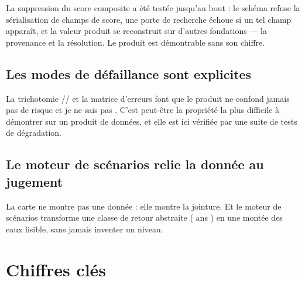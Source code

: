 La suppression du score composite a été testée jusqu'au bout : le schéma refuse
la sérialisation de champs de score, une porte de recherche échoue si un tel
champ apparaît, et la valeur produit se reconstruit sur d'autres fondations —
la provenance et la résolution. Le produit est démontrable sans son chiffre.

\subsection{Les modes de défaillance sont explicites}

La trichotomie // et la matrice d'erreurs
font que le produit ne confond jamais \og pas de risque \fg{} et \og je ne sais
pas \fg. C'est peut-être la propriété la plus difficile à démontrer sur un
produit de données, et elle est ici vérifiée par une suite de tests de
dégradation.

\subsection{Le moteur de scénarios relie la donnée au jugement}

La carte ne montre pas une donnée : elle montre la jointure. Et le moteur de
scénarios transforme une classe de retour abstraite ( ans \fg) en une
montée des eaux lisible, sans jamais inventer un niveau.

\section{Chiffres clés}

